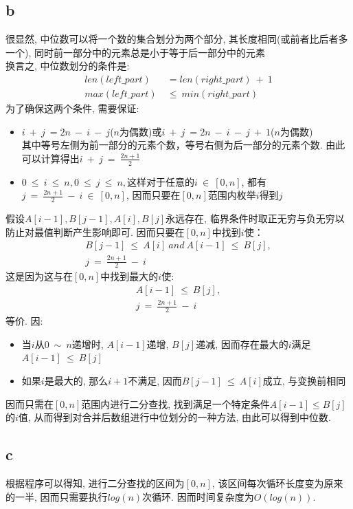 \documentclass{article}
\begin{document}
\subsection{b}
很显然, 中位数可以将一个数的集合划分为两个部分, 其长度相同(或前者比后者多一个), 同时前一部分中的元素总是小于等于后一部分中的元素 \\
换言之, 中位数划分的条件是:
\begin{align*}
len(left\_part) &= len(right\_part)\ +\ 1 \\
max(left\_part)\ &\leq \ min(right\_part) 
\end{align*}
为了确保这两个条件, 需要保证:
\begin{itemize}
\item $i\ +\ j\ =2n\ -\ i\ -\ j$($n$为偶数)或$i\ +\ j\ =2n\ -\ i\ -\ j\ +\ 1$($n$为偶数) \\
其中等号左侧为前一部分的元素个数，等号右侧为后一部分的元素个数. 由此可以计算得出$i\ +\ j\ =\ \frac{2n+1}{2}$
\item $0\ \leq \ i\ \leq \ n,0\ \leq \ j\ \leq \ n, $这样对于任意的$i\ \in \ [0,n]$, 都有$j\ =\ \frac{2n+1}{2}\ -\ i\ \in \ [0,n]$, 因而只要在$[0,n]$范围内枚举$i$得到$j$
\end{itemize}
假设$A[i-1], B[j-1],A[i],B[j]$永远存在, 临界条件时取正无穷与负无穷以防止对最值判断产生影响即可. 因而只要在$[0,n]$中找到$i$使：
\begin{align*}
B[j-1]\ \leq \ A[i]\ and\ A[i-1]\ \leq \ B[j], \\
j\ =\ \frac{2n+1}{2}\ -\ i
\end{align*}
这是因为这与在$[0,n]$中找到最大的$i$使:
\begin{align*}
A[i-1]\ \leq \ B[j], \\
j\ =\ \frac{2n+1}{2}\ -\ i
\end{align*}
等价. 因:
\begin{itemize}
\item 当$i$从$0\ \sim \ n$递增时, $A[i-1]$递增, $B[j]$递减, 因而存在最大的$i$满足$A[i-1]\ \leq \ B[j]$
\item 如果$i$是最大的, 那么$i+1$不满足, 因而$B[j-1]\ \leq \ A[i]$成立, 与变换前相同
\end{itemize}
因而只需在$[0,n]$范围内进行二分查找, 找到满足一个特定条件$A[i-1] \leq B[j]$的$i$值, 从而得到对合并后数组进行中位划分的一种方法, 由此可以得到中位数.

\subsection{c}
根据程序可以得知, 进行二分查找的区间为$[0,n]$, 该区间每次循环长度变为原来的一半, 因而只需要执行$log(n)$次循环. 因而时间复杂度为$O(log(n))$. 
\end{document}
